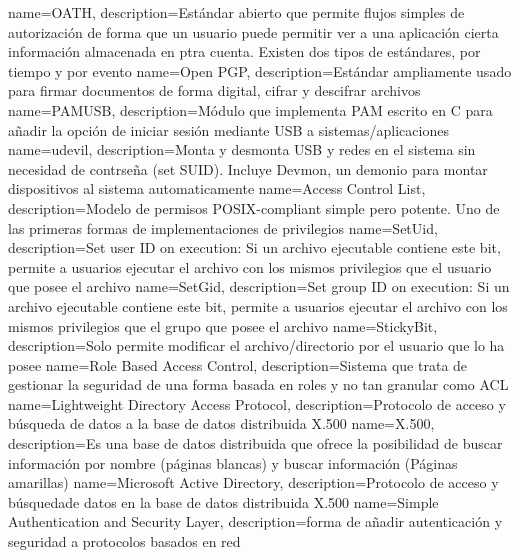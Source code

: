 {
	name=OATH,
	description={Estándar abierto que permite flujos simples de autorización de forma que un usuario puede permitir ver a una aplicación cierta información almacenada en ptra cuenta. Existen dos tipos de estándares, por tiempo y por evento}
}
{
	name=Open PGP,
	description={Estándar ampliamente usado para firmar documentos de forma digital, cifrar y descifrar archivos}
}
{
	name=PAMUSB,
	description={Módulo que implementa PAM escrito en C para añadir la opción de iniciar sesión mediante USB a sistemas/aplicaciones}
}
{
	name=udevil,
	description={Monta y desmonta USB y redes en el sistema sin necesidad de contrseña (set SUID). Incluye Devmon, un demonio para montar dispositivos al sistema automaticamente}
}
{
	name=Access Control List,
	description={Modelo de permisos POSIX-compliant simple pero potente. Uno de las primeras formas de implementaciones de privilegios}
}
{
	name=SetUid,
	description={Set user ID on execution: Si un archivo ejecutable contiene este bit, permite a usuarios ejecutar el archivo con los mismos privilegios que el usuario que posee el archivo}
}
{
	name=SetGid,
	description={Set group ID on execution: Si un archivo ejecutable contiene este bit, permite a usuarios ejecutar el archivo con los mismos privilegios que el grupo que posee el archivo}
}
{
	name=StickyBit,
	description={Solo permite modificar el archivo/directorio por el usuario que lo ha posee}
}
{
	name=Role Based Access Control,
	description={Sistema que trata de gestionar la seguridad de una forma basada en roles y no tan granular como ACL}
}
{
	name=Lightweight Directory Access Protocol,
	description={Protocolo de acceso y búsqueda de datos a la base de datos distribuida X.500}
}
{
	name=X.500,
	description={Es una base de datos distribuida que ofrece la posibilidad de buscar información por nombre (páginas blancas) y buscar información (Páginas amarillas)}
}
{
	name=Microsoft Active Directory,
	description={Protocolo de acceso y búsquedade datos en la base de datos distribuida X.500}
}
{
	name=Simple Authentication and Security Layer,
	description={forma de añadir autenticación y seguridad a protocolos basados en red}
}
